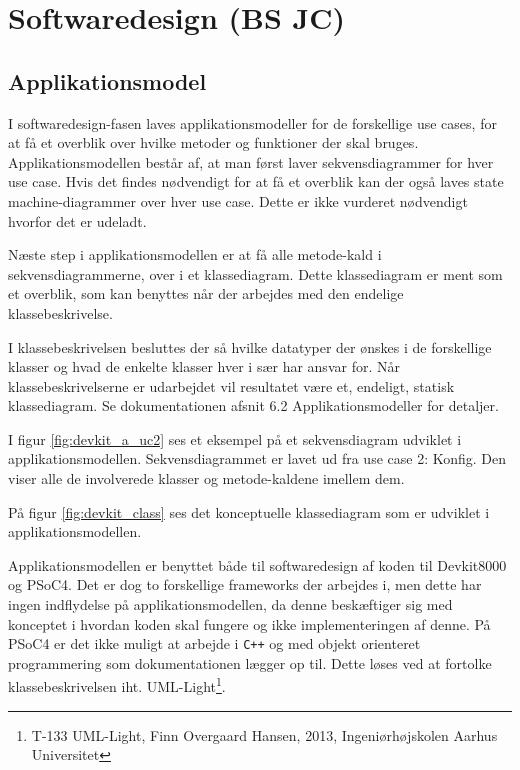 \newpage
\section{Softwaredesign (BS JC)}

\subsection{Applikationsmodel}
I softwaredesign-fasen laves applikationsmodeller for de forskellige use cases, for at få et overblik over hvilke metoder og funktioner der skal bruges. Applikationsmodellen består af, at man først laver sekvensdiagrammer for hver use case. Hvis det findes nødvendigt for at få et overblik kan der også laves state machine-diagrammer over hver use case. Dette er ikke vurderet nødvendigt hvorfor det er udeladt.

Næste step i applikationsmodellen er at få alle metode-kald i sekvensdiagrammerne, over i et klassediagram. Dette klassediagram er ment som et overblik, som kan benyttes når der arbejdes med den endelige klassebeskrivelse.

I klassebeskrivelsen besluttes der så hvilke datatyper der ønskes i de forskellige klasser og hvad de enkelte klasser hver i sær har ansvar for. Når klassebeskrivelserne er udarbejdet vil resultatet være et, endeligt, statisk klassediagram. Se dokumentationen afsnit 6.2 Applikationsmodeller for detaljer.


I figur \ref{fig:devkit_a_uc2} ses et eksempel på et sekvensdiagram udviklet i applikationsmodellen. Sekvensdiagrammet er lavet ud fra use case 2: Konfig. Den viser alle de involverede klasser og metode-kaldene imellem dem.

På figur \ref{fig:devkit_class} ses det konceptuelle klassediagram som er udviklet i applikationsmodellen.


Applikationsmodellen er benyttet både til softwaredesign af koden til Devkit8000 og PSoC4. Det er dog to forskellige frameworks der arbejdes i, men dette har ingen indflydelse på applikationsmodellen, da denne beskæftiger sig med konceptet i hvordan koden skal fungere og ikke implementeringen af denne. På PSoC4 er det ikke muligt at arbejde i \verb-C++- og med objekt orienteret programmering som dokumentationen lægger op til. Dette løses ved at fortolke klassebeskrivelsen iht. UML-Light\footnote{T-133 UML-Light, Finn Overgaard Hansen, 2013, Ingeniørhøjskolen Aarhus Universitet}.

